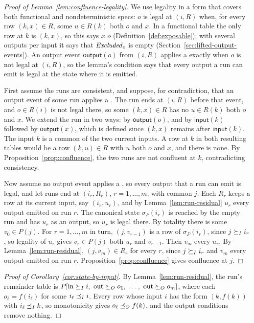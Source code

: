 \begin{proof}[Proof of Lemma~\ref{lem:confluence-legality}]
We use legality in a form that covers both functional and nondeterministic
specs: $o$ is legal at $(i,R)$ when, for every row $(k,x)\in R$, some
$u\in R(k)$ \outrel both $o$ and $x$.  In a functional table the only row at
$k$ is $(k,x)$, so this says $x$ \outrel $o$
(Definition~\ref{def:exposable}); with several outputs per input it says that
$\mathit{Excluded}_o$ is empty (Section~\ref{sec:lifted-output-events}).  An output
event $\mathsf{output}(o)$ from $(i,R)$ applies a \commitment exactly when $o$
is not legal at $(i,R)$, so the lemma's condition says that every output a run
can emit is legal at the state where it is emitted.

First assume the runs are consistent, and suppose, for contradiction, that an
output event of some run applies a \commitment.  The run ends at $(i,R)$
before that event, and $o\in R(i)$ is not legal there, so some $(k,x)\in R$
has no $u\in R(k)$ \outrelpart both $o$ and $x$.  We extend the run in two ways: by $\mathsf{output}(o)$, and by
$\mathsf{input}(k)$ followed by $\mathsf{output}(x)$, which is defined since
$(k,x)$ remains after $\mathsf{input}(k)$.  The input $k$ is a common \indesc
of the two current inputs.  A row at $k$ in both resulting tables would be a
row $(k,u)\in R$ with $u$ \outrelpart both $o$ and $x$, and there is none.  By
Proposition~\ref{prop:confluence}, the two runs are not confluent at $k$,
contradicting consistency.

Now assume no output event applies a \commitment, so every output that a run
can emit is legal, and let runs end at $(i_r,R_r)$, $r=1,\ldots,m$, with
common \indesc $j$.  Each $R_r$ keeps a
row at its current input, say $(i_r,u_r)$, and by Lemma~\ref{lem:run-residual}
$u_r$ \outrel every output emitted on run $r$.  The canonical state
$\sigma_P(i_r)$ is reached by the empty run and has $u_r$ as an output, so $u_r$
is legal there.  By totality there is some $v_0\in P(j)$.  For $r=1,\ldots,m$
in turn, $(j,v_{r-1})$ is a row of $\sigma_P(i_r)$, since $j\succeq_I i_r$, so
legality of $u_r$ gives $v_r\in P(j)$ \outrelpart both $u_r$ and $v_{r-1}$.
Then $v_m$ \outrel every $u_r$.  By Lemma~\ref{lem:run-residual},
$(j,v_m)\in R_r$ for every $r$, since $j\succeq_I i_r$ and $v_m$ \outrel every
output emitted on run $r$.  Proposition~\ref{prop:confluence} gives
confluence at $j$.
\end{proof}

\begin{proof}[Proof of Corollary~\ref{cor:state-by-input}]
By Lemma~\ref{lem:run-residual}, the run's remainder table is
$P[\mathrm{in}\InputGe i,\ \mathrm{out}\OutputGe o_1,\ \ldots,\
\mathrm{out}\OutputGe o_m]$, where each $o_\ell=f(i_\ell)$ for some
$i_\ell\preceq_I i$.  Every row whose input \inrel $i$ has the form $(k,f(k))$ with
$i_\ell\preceq_I k$, so monotonicity gives $o_\ell\preceq_O f(k)$, and the
output conditions remove nothing.
\end{proof}

